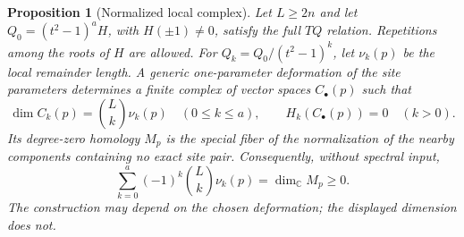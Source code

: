 \documentclass[11pt]{article}
\newtheorem{proposition}{Proposition}[section]
\theoremstyle{definition}
\newcommand{\C}{\mathbb C}
\begin{document}
\begin{proposition}[Normalized local complex]
\label{prop:normalized-local-complex}
Let $L\ge2n$ and let
$Q_0=(t^2-1)^aH$, with $H(\pm1)\ne0$, satisfy the full $TQ$
relation. Repetitions among the roots of $H$ are allowed. For
$Q_k=Q_0/(t^2-1)^k$, let $\nu_k(p)$ be the local remainder length.
A generic one-parameter deformation of the site parameters determines
a finite complex of vector spaces $C_\bullet(p)$ such that
\begin{equation}\label{eq:normalized-local-complex-dimensions}
 \dim C_k(p)=\binom Lk\nu_k(p)\quad(0\le k\le a),\qquad
 H_k(C_\bullet(p))=0\quad(k>0).
\end{equation}
Its degree-zero homology $M_p$ is the special fiber of the
normalization of the nearby components containing no exact site pair.
Consequently, without spectral input,
\begin{equation}\label{eq:geometric-local-positivity}
 \boxed{\sum_{k=0}^a(-1)^k\binom Lk\nu_k(p)
              =\dim_\C M_p\ge0.}
\end{equation}
The construction may depend on the chosen deformation; the displayed
dimension does not.
\end{proposition}
\end{document}
